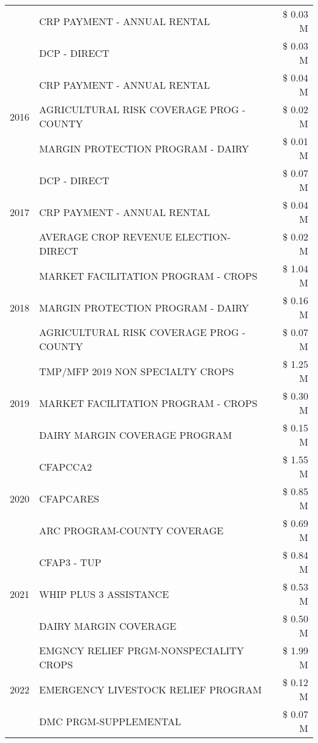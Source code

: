 \begin{tabular}{llr}
 & CRP PAYMENT - ANNUAL RENTAL & \$ 0.03 M \\
 & DCP - DIRECT & \$ 0.03 M \\
\cline{1-3}
\multirow[t]{3}{*}{2016} & CRP PAYMENT - ANNUAL RENTAL & \$ 0.04 M \\
 & AGRICULTURAL RISK COVERAGE PROG - COUNTY & \$ 0.02 M \\
 & MARGIN PROTECTION PROGRAM - DAIRY & \$ 0.01 M \\
\cline{1-3}
\multirow[t]{3}{*}{2017} & DCP - DIRECT & \$ 0.07 M \\
 & CRP PAYMENT - ANNUAL RENTAL & \$ 0.04 M \\
 & AVERAGE CROP REVENUE ELECTION-DIRECT & \$ 0.02 M \\
\cline{1-3}
\multirow[t]{3}{*}{2018} & MARKET FACILITATION PROGRAM - CROPS & \$ 1.04 M \\
 & MARGIN PROTECTION PROGRAM - DAIRY & \$ 0.16 M \\
 & AGRICULTURAL RISK COVERAGE PROG - COUNTY & \$ 0.07 M \\
\cline{1-3}
\multirow[t]{3}{*}{2019} & TMP/MFP 2019 NON SPECIALTY CROPS & \$ 1.25 M \\
 & MARKET FACILITATION PROGRAM - CROPS & \$ 0.30 M \\
 & DAIRY MARGIN COVERAGE PROGRAM & \$ 0.15 M \\
\cline{1-3}
\multirow[t]{3}{*}{2020} & CFAPCCA2 & \$ 1.55 M \\
 & CFAPCARES & \$ 0.85 M \\
 & ARC PROGRAM-COUNTY COVERAGE & \$ 0.69 M \\
\cline{1-3}
\multirow[t]{3}{*}{2021} & CFAP3 - TUP & \$ 0.84 M \\
 & WHIP PLUS 3 ASSISTANCE & \$ 0.53 M \\
 & DAIRY MARGIN COVERAGE & \$ 0.50 M \\
\cline{1-3}
\multirow[t]{3}{*}{2022} & EMGNCY RELIEF PRGM-NONSPECIALITY CROPS & \$ 1.99 M \\
 & EMERGENCY LIVESTOCK RELIEF PROGRAM & \$ 0.12 M \\
 & DMC PRGM-SUPPLEMENTAL & \$ 0.07 M \\
\cline{1-3}
\bottomrule
\end{tabular}
